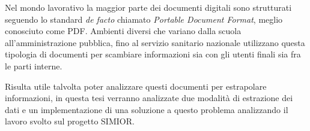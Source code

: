 \vspace{4cm}
Nel mondo lavorativo la maggior parte dei documenti digitali sono strutturati seguendo lo standard \textit{de facto} chiamato \textit{Portable Document Format}, meglio conosciuto come PDF. Ambienti diversi che variano dalla scuola all'amministrazione pubblica, fino al servizio sanitario nazionale utilizzano questa tipologia di documenti per scambiare informazioni sia con gli utenti finali sia fra le parti interne.
\par\bigskip
Risulta utile talvolta poter analizzare questi documenti per estrapolare informazioni, in questa tesi verranno analizzate due modalità di estrazione dei dati e un implementazione di una soluzione a questo problema analizzando il lavoro svolto sul progetto SIMIOR.
